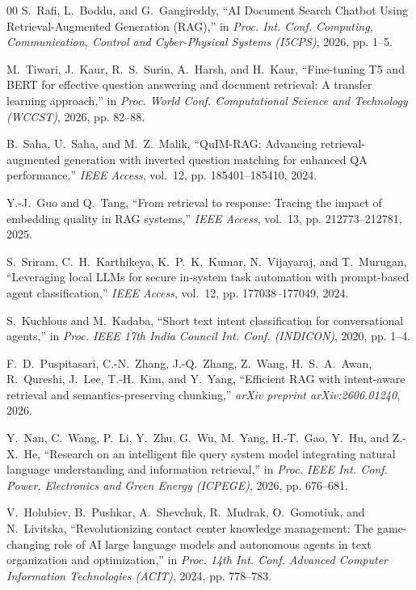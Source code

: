 \documentclass[conference]{IEEEtran}
\begin{document}
\begin{thebibliography}{00}
S.~Rafi, L.~Boddu, and G.~Gangireddy, ``AI Document Search Chatbot Using Retrieval-Augmented Generation (RAG),'' in \emph{Proc. Int. Conf. Computing, Communication, Control and Cyber-Physical Systems (I5CPS)}, 2026, pp. 1--5.

M.~Tiwari, J.~Kaur, R.~S.~Surin, A.~Harsh, and H.~Kaur, ``Fine-tuning T5 and BERT for effective question answering and document retrieval: A transfer learning approach,'' in \emph{Proc. World Conf. Computational Science and Technology (WCCST)}, 2026, pp. 82--88.

B.~Saha, U.~Saha, and M.~Z.~Malik, ``QuIM-RAG: Advancing retrieval-augmented generation with inverted question matching for enhanced QA performance,'' \emph{IEEE Access}, vol.~12, pp. 185401--185410, 2024.

Y.-J.~Guo and Q.~Tang, ``From retrieval to response: Tracing the impact of embedding quality in RAG systems,'' \emph{IEEE Access}, vol.~13, pp. 212773--212781, 2025.

S.~Sriram, C.~H.~Karthikeya, K.~P.~K.~Kumar, N.~Vijayaraj, and T.~Murugan, ``Leveraging local LLMs for secure in-system task automation with prompt-based agent classification,'' \emph{IEEE Access}, vol.~12, pp. 177038--177049, 2024.

S.~Kuchlous and M.~Kadaba, ``Short text intent classification for conversational agents,'' in \emph{Proc. IEEE 17th India Council Int. Conf. (INDICON)}, 2020, pp. 1--4.

F.~D.~Puspitasari, C.-N.~Zhang, J.-Q.~Zhang, Z.~Wang, H.~S.~A.~Awan, R.~Qureshi, J.~Lee, T.-H.~Kim, and Y.~Yang, ``Efficient RAG with intent-aware retrieval and semantics-preserving chunking,'' \emph{arXiv preprint arXiv:2606.01240}, 2026.

Y.~Nan, C.~Wang, P.~Li, Y.~Zhu, G.~Wu, M.~Yang, H.-T.~Gao, Y.~Hu, and Z.-X.~He, ``Research on an intelligent file query system model integrating natural language understanding and information retrieval,'' in \emph{Proc. IEEE Int. Conf. Power, Electronics and Green Energy (ICPEGE)}, 2026, pp. 676--681.

V.~Holubiev, B.~Pushkar, A.~Shevchuk, R.~Mudrak, O.~Gomotiuk, and N.~Livitska, ``Revolutionizing contact center knowledge management: The game-changing role of AI large language models and autonomous agents in text organization and optimization,'' in \emph{Proc. 14th Int. Conf. Advanced Computer Information Technologies (ACIT)}, 2024, pp. 778--783.


\end{thebibliography}
\end{document}
